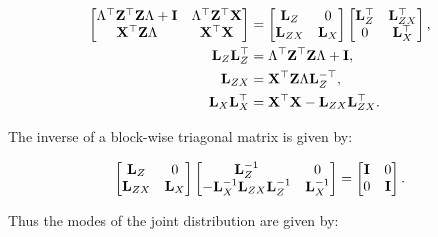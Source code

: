 \documentclass[10pt]{article}
\begin{document}
\begin{align*}
\begin{bmatrix}
\Lambda^\top {\bf Z}^\top {\bf Z}\Lambda + {\bf I} & \Lambda^\top {\bf
  Z}^\top {\bf X} \\
  {\bf X}^\top {\bf Z}\Lambda & {\bf X}^\top{\bf X}\end{bmatrix} & =
\begin{bmatrix} {\bf L}_Z & 0 \\ {\bf L}_{ZX} & {\bf
    L}_{X} \end{bmatrix}
\begin{bmatrix} {\bf L}^\top_Z & {\bf L}^\top_{ZX} \\ 0 & {\bf
    L}^\top_{X} \end{bmatrix}, \\
{\bf L}_Z{\bf L}_Z^\top & = \Lambda^\top {\bf Z}^\top {\bf Z}\Lambda +
{\bf I}, \\
{\bf L}_{ZX} & = {\bf X}^\top{\bf Z}\Lambda{\bf L}_Z^{-\top}, \\
{\bf L}_X{\bf L}_X^\top & = {\bf X}^\top{\bf X} - {\bf L}_{ZX}{\bf L}_{ZX}^\top.
\end{align*}

The inverse of a block-wise triagonal matrix is given by:

\begin{equation*}
\begin{bmatrix} {\bf L}_Z & 0 \\ {\bf L}_{ZX} & {\bf
    L}_{X} \end{bmatrix}
\begin{bmatrix} {\bf L}_Z^{-1} & 0 \\ - {\bf L}_X^{-1} {\bf L}_{ZX}{\bf L}_Z^{-1} & {\bf
    L}_{X}^{-1} \end{bmatrix}
 = 
\begin{bmatrix} {\bf I} & 0 \\0 & {\bf I} \end{bmatrix}.
\end{equation*}

Thus the modes of the joint distribution are given by:
\end{document}
